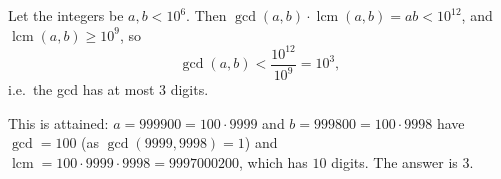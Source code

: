 Let the integers be $a,b<10^6$. Then $\gcd(a,b)\cdot\operatorname{lcm}(a,b)=ab<10^{12}$, and $\operatorname{lcm}(a,b)\ge10^9$, so
\[
\gcd(a,b)<\dfrac{10^{12}}{10^9}=10^3 ,
\]
i.e.\ the gcd has at most $3$ digits.

This is attained: $a=999900=100\cdot9999$ and $b=999800=100\cdot9998$ have $\gcd=100$ (as $\gcd(9999,9998)=1$) and $\operatorname{lcm}=100\cdot9999\cdot9998=9997000200$, which has $10$ digits. The answer is $\boxed{3}$.
